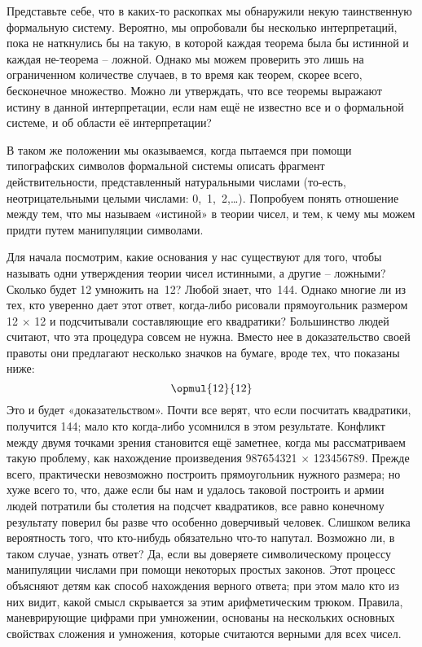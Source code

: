 \documentclass[../main.tex]{subfiles}
\begin{document}
Представьте себе, что в каких-то раскопках мы обнаружили некую таинственную формальную систему. Вероятно, мы опробовали бы несколько интерпретаций, пока не наткнулись бы на такую, в которой каждая теорема была бы истинной и каждая не-теорема \--- ложной. Однако мы можем проверить это лишь на ограниченном количестве случаев, в то время как теорем, скорее всего, бесконечное множество. Можно ли утверждать, что все теоремы выражают истину в данной интерпретации, если нам ещё не известно все и о формальной системе, и об области её интерпретации?

В таком же положении мы оказываемся, когда пытаемся при помощи типографских символов формальной системы описать фрагмент действительности, представленный натуральными числами (то-есть, неотрицательными целыми числами: 0,~1,~2,\ldots). Попробуем понять отношение между тем, что мы называем «истиной» в теории чисел, и тем, к чему мы можем придти путем манипуляции символами.

Для начала посмотрим, какие основания у нас существуют для того, чтобы называть одни утверждения теории чисел истинными, а другие \--- ложными? Сколько будет 12 умножить на~12? Любой знает, что~144. Однако многие ли из тех, кто уверенно дает этот ответ, когда-либо рисовали прямоугольник размером 12 $\times$ 12 и подсчитывали составляющие его квадратики? Большинство людей считают, что эта процедура совсем не нужна. Вместо нее в доказательство своей правоты они предлагают несколько значков на бумаге, вроде тех, что показаны ниже:
\[
    \opmul{12}{12}
\]
Это и будет «доказательством». Почти все верят, что если посчитать квадратики, получится 144; мало кто когда-либо усомнился в этом результате. Конфликт между двумя точками зрения становится ещё заметнее, когда мы рассматриваем такую проблему, как нахождение произведения \num{987654321} $\times$ \num{123456789}. Прежде всего, практически невозможно построить прямоугольник нужного размера; но хуже всего то, что, даже если бы нам и удалось таковой построить и армии людей потратили бы столетия на подсчет квадратиков, все равно конечному результату поверил бы разве что особенно доверчивый человек. Слишком велика вероятность того, что кто-нибудь обязательно что-то напутал. Возможно ли, в таком случае, узнать ответ? Да, если вы доверяете символическому процессу манипуляции числами при помощи некоторых простых законов. Этот процесс объясняют детям как способ нахождения верного ответа; при этом мало кто из них видит, какой смысл скрывается за этим арифметическим трюком. Правила, маневрирующие цифрами при умножении, основаны на нескольких основных свойствах сложения и умножения, которые считаются верными для всех чисел.
\end{document}
